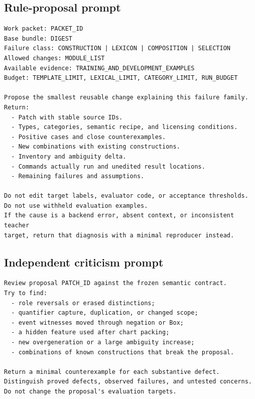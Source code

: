 \documentclass[11pt,a4paper]{article}
\begin{document}
\clearpage
\subsection{Rule-proposal prompt}
\begin{lstlisting}
Work packet: PACKET_ID
Base bundle: DIGEST
Failure class: CONSTRUCTION | LEXICON | COMPOSITION | SELECTION
Allowed changes: MODULE_LIST
Available evidence: TRAINING_AND_DEVELOPMENT_EXAMPLES
Budget: TEMPLATE_LIMIT, LEXICAL_LIMIT, CATEGORY_LIMIT, RUN_BUDGET

Propose the smallest reusable change explaining this failure family.
Return:
  - Patch with stable source IDs.
  - Types, categories, semantic recipe, and licensing conditions.
  - Positive cases and close counterexamples.
  - New combinations with existing constructions.
  - Inventory and ambiguity delta.
  - Commands actually run and unedited result locations.
  - Remaining failures and assumptions.

Do not edit target labels, evaluator code, or acceptance thresholds.
Do not use withheld evaluation examples.
If the cause is a backend error, absent context, or inconsistent teacher
target, return that diagnosis with a minimal reproducer instead.
\end{lstlisting}

\clearpage
\subsection{Independent criticism prompt}
\begin{lstlisting}
Review proposal PATCH_ID against the frozen semantic contract.
Try to find:
  - role reversals or erased distinctions;
  - quantifier capture, duplication, or changed scope;
  - event witnesses moved through negation or Box;
  - a hidden feature used after chart packing;
  - new overgeneration or a large ambiguity increase;
  - combinations of known constructions that break the proposal.

Return a minimal counterexample for each substantive defect.
Distinguish proved defects, observed failures, and untested concerns.
Do not change the proposal's evaluation targets.
\end{lstlisting}
\end{document}
